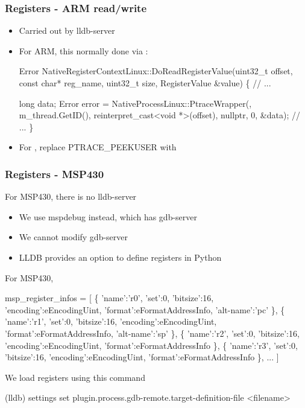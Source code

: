 \begin{frame}[fragile]
\frametitle{Registers - ARM read/write}
\begin{itemize}
    [triangle]
    \item Carried out by lldb-server
    \item For ARM, this normally done via :
\begin{codebox2}
Error
NativeRegisterContextLinux::DoReadRegisterValue(uint32_t offset,
                                                const char* reg_name,
                                                uint32_t size,
                                                RegisterValue &value)
\{
    // ...

    long data;
    Error error = NativeProcessLinux::PtraceWrapper(,
                                                    m_thread.GetID(),
                                                    reinterpret_cast<void *>(offset),
                                                    nullptr,
                                                    0,
                                                    &data);
    // ...
\}
\end{codebox2}
\item For , replace PTRACE\_PEEKUSER with 
\end{itemize}

\end{frame}

\begin{frame}[fragile]
\frametitle{Registers - MSP430}
For MSP430, there is no lldb-server
\begin{itemize}
    \item We use mspdebug instead, which has gdb-server
    \item We cannot modify gdb-server
    \item LLDB provides an option to define registers in Python
\end{itemize}
For MSP430,
\begin{codebox2}
msp_register_infos = [
\{ 'name':'r0', 'set':0, 'bitsize':16, 'encoding':eEncodingUint, 'format':eFormatAddressInfo, 'alt-name':'pc' \},
\{ 'name':'r1', 'set':0, 'bitsize':16, 'encoding':eEncodingUint, 'format':eFormatAddressInfo, 'alt-name':'sp' \},
\{ 'name':'r2', 'set':0, 'bitsize':16, 'encoding':eEncodingUint, 'format':eFormatAddressInfo   \},
\{ 'name':'r3', 'set':0, 'bitsize':16, 'encoding':eEncodingUint, 'format':eFormatAddressInfo   \},
...
]
\end{codebox2}

\vspace{10pt}
We load registers using this command
\begin{codebox}
(lldb) settings set plugin.process.gdb-remote.target-definition-file <filename>
\end{codebox}
\end{frame}

